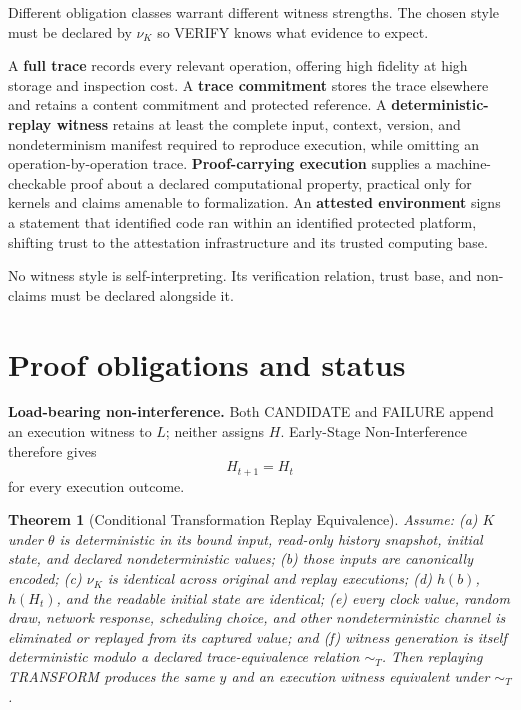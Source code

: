 \documentclass[11pt,openany]{book}
\newtheorem{theorem}[definition]{Theorem}
\begin{document}
Different obligation classes warrant different witness strengths. The chosen
style must be declared by \(\nu_K\) so VERIFY knows what evidence to expect.

A \textbf{full trace} records every relevant operation, offering high fidelity
at high storage and inspection cost. A \textbf{trace commitment} stores the
trace elsewhere and retains a content commitment and protected reference. A
\textbf{deterministic-replay witness} retains at least the complete input,
context, version, and nondeterminism manifest required to reproduce execution,
while omitting an operation-by-operation trace. \textbf{Proof-carrying
execution} supplies a machine-checkable proof about a declared computational
property, practical only for kernels and claims amenable to formalization.
An \textbf{attested environment} signs a statement that identified code ran
within an identified protected platform, shifting trust to the attestation
infrastructure and its trusted computing base.

No witness style is self-interpreting. Its verification relation, trust base,
and non-claims must be declared alongside it.

\section{Proof obligations and status}

\textbf{Load-bearing non-interference.} Both CANDIDATE and FAILURE append an
execution witness to \(L\); neither assigns \(H\). Early-Stage
Non-Interference therefore gives
\[
 H_{t+1}=H_t
\]
for every execution outcome.

\begin{theorem}[Conditional Transformation Replay Equivalence]
Assume: (a) \(K\) under \(\theta\) is deterministic in its bound input,
read-only history snapshot, initial state, and declared nondeterministic values;
(b) those inputs are canonically encoded; (c) \(\nu_K\) is identical across
original and replay executions; (d) \(h(b)\), \(h(H_t)\), and the readable
initial state are identical; (e) every clock value, random draw, network
response, scheduling choice, and other nondeterministic channel is eliminated
or replayed from its captured value; and (f) witness generation is itself
deterministic modulo a declared trace-equivalence relation \(\sim_T\). Then
replaying TRANSFORM produces the same \(y\) and an execution witness equivalent
under \(\sim_T\).
\end{theorem}
\end{document}
